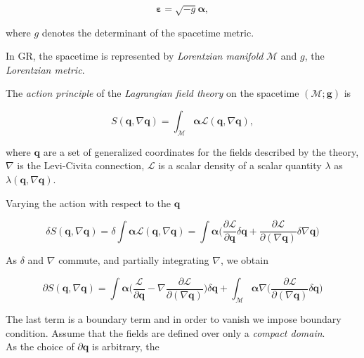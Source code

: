 \begin{equation}
\boldsymbol{\varepsilon} = \sqrt{-g}\boldsymbol{\alpha},
\end{equation}

where $g$ denotes the determinant of the spacetime metric.

In GR, the spacetime is represented by \textit{Lorentzian manifold} $\mathcal{M}$ and $g$, the \textit{Lorentzian metric}.

The \textit{action principle} of the \textit{Lagrangian field theory} on the spacetime $(\mathcal{M}; \boldsymbol{g})$ is

\begin{equation}
S(\boldsymbol{q}, \nabla\boldsymbol{q}) = \int_{\mathcal{M}}\boldsymbol{\alpha}\mathcal{L}(\boldsymbol{q}, \nabla\boldsymbol{q}),
\end{equation}

where $\boldsymbol{q}$ are a set of generalized coordinates for the fields described by the theory, $\nabla$ is the Levi-Civita connection, $\mathcal{L}$ is a scalar density of a scalar quantity $\lambda$ as $\lambda(\boldsymbol{q},\nabla\boldsymbol{q})$. 

Varying the action with respect to the $\boldsymbol{q}$

\begin{equation}
\delta S(\boldsymbol{q}, \nabla\boldsymbol{q}) = \delta\int\boldsymbol{\alpha}\mathcal{L}(\boldsymbol{q}, \nabla\boldsymbol{q}) = \int\boldsymbol{\alpha}\Big(\frac{\partial\mathcal{L}}{\partial\boldsymbol{q}}\delta\boldsymbol{q}+\frac{\partial\mathcal{L}}{\partial(\nabla\boldsymbol{q})}\delta\nabla\boldsymbol{q}\Big)
\end{equation}

As $\delta$ and $\nabla$ commute, and partially integrating $\nabla$, we obtain

\begin{equation}
\partial S(\boldsymbol{q}, \nabla\boldsymbol{q}) = \int\boldsymbol{\alpha}\Big(\frac{\mathcal{L}}{\partial\boldsymbol{q}}-\nabla\frac{\partial \mathcal{L}}{\partial(\nabla\boldsymbol{q})}\Big)\delta\boldsymbol{q} + \int_{\mathcal{M}}\boldsymbol{\alpha}\nabla\Big(\frac{\partial\mathcal{L}}{\partial(\nabla\boldsymbol{q})}\delta\boldsymbol{q}\Big)
\end{equation}

The last term is a boundary term and in order to vanish we impose boundary condition. 
Assume that the fields are defined over only a \textit{compact domain}. \\
As the choice of $\partial\boldsymbol{q}$ is arbitrary, the 


